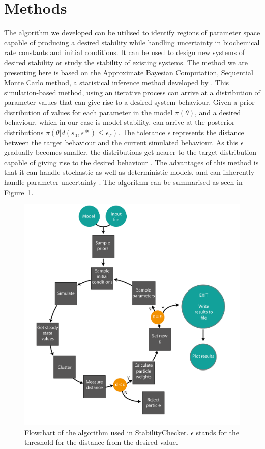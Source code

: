 \section{Methods}

The algorithm we developed can be utilised to identify regions of parameter space capable of producing a desired stability while handling uncertainty in biochemical rate constants and initial conditions. It can be used to design new systems of desired stability or study the stability of existing systems. The method we are presenting here is based on the Approximate Bayesian Computation, Sequential Monte Carlo method, a statistical inference method developed by \textcite{Toni:2009tr}. This simulation-based method, using an iterative process can arrive at a distribution of parameter values that can give rise to a desired system behaviour. Given a prior distribution of values for each parameter in the model $\pi(\theta)$, and a desired behaviour, which in our case is model stability, can arrive at the posterior distributions $\pi(\theta|d(s_0, s*)\leq \epsilon_T)$. The tolerance $\epsilon$ represents the distance between the target behaviour and the current simulated behaviour. As this $\epsilon$ gradually becomes smaller, the distributions get nearer to the target distribution capable of giving rise to the desired behaviour \autocite{Toni:2009tr}. The advantages of this method is that it can handle stochastic as well as deterministic models, and can inherently handle parameter uncertainty \autocite{Barnes:2011hh}. The algorithm can be summarised as seen in Figure~\ref{fig:flowchart}.

\begin{figure}[p]
	\centering
	\includegraphics[scale=0.5]{chapterModelling/images/StabilityChecker_flowchart-01}
	\caption[Flowchart of the algorithm used in StabilityChecker]{Flowchart of the algorithm used in StabilityChecker. $\epsilon$ stands for the threshold for the distance from the desired value.}
	\label{fig:flowchart}
\end{figure}

